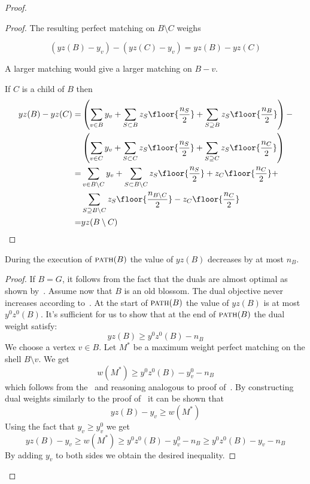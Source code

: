 \begin{proof}
\begin{proof}
    The resulting perfect matching on $B \setminus C$ weighs

    \[ (yz(B) - y_v) - (yz(C) - y_v) = yz(B) - yz(C) \]

    A larger matching would give a larger matching on $B - v$.

    If $C$ is a child of $B$ then
    \begin{align*}
    yz(B) - yz(C) =
      &\left(\sum_{v \in B} y_v + \sum_{S \subset B} z_S \floor{\frac{n_S}{2}} + \sum_{S \supseteq B} z_S \floor{\frac{n_B}{2}}\right) - \\
    &\left(\sum_{v \in C} y_v + \sum_{S \subset C} z_S \floor{\frac{n_S}{2}} + \sum_{S \supseteq C} z_S \floor{\frac{n_C}{2}}\right)  \\
    = &\sum_{v \in B \setminus C} y_v + \sum_{S \subset B \setminus C} z_S \floor{\frac{n_S}{2}} + z_C\floor{\frac{n_C}{2}} + \\
    &\sum_{S \supseteq B \setminus C} z_S \floor{\frac{n_{B \setminus C}}{2}} - z_C\floor{\frac{n_C}{2}} \\
    = &yz(B \setminus C)
    \end{align*}
\end{proof}

\begin{lemma}\label{lem:pathyz}
    During the execution of $\textsc{path}(B)$ the value of $yz(B)$ decreases by at most $n_B$.
\end{lemma}

\begin{proof}
    If $B = G$, it follows from the fact that the duals are almost optimal as shown by~.
    Assume now that $B$ is an old blossom. The dual objective never increases according to~. At the start of $\textsc{path}(B)$ the value of $yz(B)$ is at most $y^0z^0(B)$. It's sufficient for us to show that at the end of $\textsc{path}(B)$ the dual weight satisfy:
    \[ yz(B) \geq y^0z^0(B) - n_B \]
    We choose a vertex $v \in B$. Let $M^*$ be a maximum weight perfect matching on the shell $B \setminus v$. We get
    \[ w(M^*) \geq y^0z^0(B) - y^0_v - n_B \]
    which follows from the~ and reasoning analogous to proof of~. By constructing dual weights similarly to the proof of~ it can be shown that
    \[ yz(B) - y_v \geq w(M^*) \]
    Using the fact that $y_v \geq y_v^0$ we get
    \[ yz(B) - y_v \geq w(M^*) \geq y^0z^0(B) - y^0_v - n_B \geq y^0z^0(B) - y_v - n_B \]
    By adding $y_v$ to both sides we obtain the desired inequality.
\end{proof}


\end{proof}
